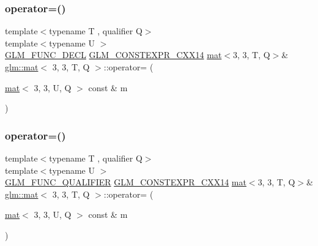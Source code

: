 \mbox{\label{structglm_1_1mat_3_013_00_013_00_01_t_00_01_q_01_4_a53aae107d0de9b06cf3def3d0645883f}} 
\subsubsection{\texorpdfstring{operator=()}{operator=()}\hspace{0.1cm}{\footnotesize\ttfamily [2/3]}}
{\footnotesize\ttfamily template$<$typename T , qualifier Q$>$ \\
template$<$typename U $>$ \\
\mbox{\hyperlink{setup_8hpp_ab2d052de21a70539923e9bcbf6e83a51}{G\+L\+M\+\_\+\+F\+U\+N\+C\+\_\+\+D\+E\+CL}} \mbox{\hyperlink{setup_8hpp_a4dd12abf5e1164bc57f3a34671d03844}{G\+L\+M\+\_\+\+C\+O\+N\+S\+T\+E\+X\+P\+R\+\_\+\+C\+X\+X14}} \mbox{\hyperlink{structglm_1_1mat}{mat}}$<$3, 3, T, Q$>$\& \mbox{\hyperlink{structglm_1_1mat}{glm\+::mat}}$<$ 3, 3, T, Q $>$\+::operator= (\begin{DoxyParamCaption}\item[{\mbox{\hyperlink{structglm_1_1mat}{mat}}$<$ 3, 3, U, Q $>$ const \&}]{m }\end{DoxyParamCaption})}

\mbox{\label{structglm_1_1mat_3_013_00_013_00_01_t_00_01_q_01_4_aec5bce9abbb6bbe0b55fbec3b8c01098}} 
\subsubsection{\texorpdfstring{operator=()}{operator=()}\hspace{0.1cm}{\footnotesize\ttfamily [3/3]}}
{\footnotesize\ttfamily template$<$typename T , qualifier Q$>$ \\
template$<$typename U $>$ \\
\mbox{\hyperlink{setup_8hpp_a33fdea6f91c5f834105f7415e2a64407}{G\+L\+M\+\_\+\+F\+U\+N\+C\+\_\+\+Q\+U\+A\+L\+I\+F\+I\+ER}} \mbox{\hyperlink{setup_8hpp_a4dd12abf5e1164bc57f3a34671d03844}{G\+L\+M\+\_\+\+C\+O\+N\+S\+T\+E\+X\+P\+R\+\_\+\+C\+X\+X14}} \mbox{\hyperlink{structglm_1_1mat}{mat}}$<$3, 3, T, Q$>$\& \mbox{\hyperlink{structglm_1_1mat}{glm\+::mat}}$<$ 3, 3, T, Q $>$\+::operator= (\begin{DoxyParamCaption}\item[{\mbox{\hyperlink{structglm_1_1mat}{mat}}$<$ 3, 3, U, Q $>$ const \&}]{m }\end{DoxyParamCaption})}



